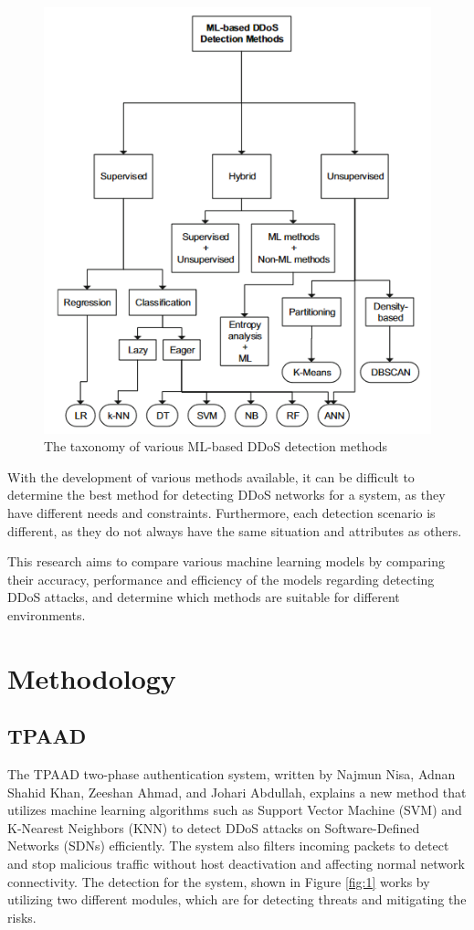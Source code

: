 \documentclass[a4paper, 12pt]{article}
\begin{document}
\begin{figure}[H]
    \centering
    \includegraphics[width=0.7\linewidth]{testt.png}
    \caption{The taxonomy of various ML-based DDoS detection methods \protect{}}
    \label{fig:0}
\end{figure}
 
With the development of various methods available, it can be difficult to determine the best method for detecting DDoS networks for a system, as they have different needs and constraints. Furthermore, each detection scenario is different, as they do not always have the same situation and attributes as others. 

This research aims to compare various machine learning models by comparing their accuracy, performance and efficiency of the models regarding detecting DDoS attacks, and determine which methods are suitable for different environments. 

\clearpage

\section{Methodology}
\subsection{TPAAD}
The TPAAD two-phase authentication system, written by Najmun Nisa, Adnan Shahid Khan, Zeeshan Ahmad, and Johari Abdullah, explains a new method that utilizes machine learning algorithms such as Support Vector Machine (SVM) and K-Nearest Neighbors (KNN) to detect DDoS attacks on Software-Defined Networks (SDNs) efficiently. The system also filters incoming packets to detect and stop malicious traffic without host deactivation and affecting normal network connectivity.  The detection for the system, shown in Figure \ref{fig:1} works by utilizing two different modules, which are for detecting threats and mitigating the risks. 
\end{document}
